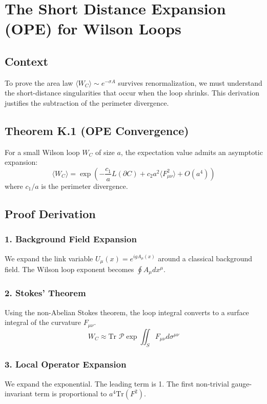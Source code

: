 \chapter{The Short Distance Expansion (OPE) for Wilson Loops}
\label{ch:ope_expansion}

\section{Context}
To prove the area law $\langle W_C \rangle \sim e^{-\sigma A}$ survives renormalization, we must understand the short-distance singularities that occur when the loop shrinks. This derivation justifies the subtraction of the perimeter divergence.

\section{Theorem K.1 (OPE Convergence)}
For a small Wilson loop $W_{C}$ of size $a$, the expectation value admits an asymptotic expansion:
\begin{equation}
\langle W_{C} \rangle = \exp\left( - \frac{c_1}{a} L(\partial C) + c_2 a^2 \langle F_{\mu\nu}^2 \rangle + O(a^4) \right)
\end{equation}
where $c_1/a$ is the perimeter divergence.

\section{Proof Derivation}
\subsection{1. Background Field Expansion}
We expand the link variable $U_\mu(x) = e^{ig A_\mu(x)}$ around a classical background field. The Wilson loop exponent becomes $\oint A_\mu dx^\mu$.

\subsection{2. Stokes' Theorem}
Using the non-Abelian Stokes theorem, the loop integral converts to a surface integral of the curvature $F_{\mu\nu}$.
\begin{equation}
W_C \approx \text{Tr } \mathcal{P} \exp \iint_S F_{\mu\nu} d\sigma^{\mu\nu}
\end{equation}

\subsection{3. Local Operator Expansion}
We expand the exponential. The leading term is 1. The first non-trivial gauge-invariant term is proportional to $a^4 \text{Tr}(F^2)$.

